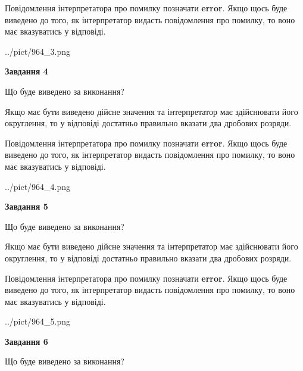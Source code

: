 \documentclass[12pt, ukrainian]{article}
\begin{document}
{\begin {Large}
Повідомлення інтерпретатора про помилку позначати \textbf{error}.
Якщо щось буде виведено до того, як інтерпретатор видасть повідомлення про помилку, 
то воно має вказуватись у відповіді. \par

\begin{center}
	{../pict/964_3.png}
\end{center}
\newpage

{\begin {center}\textbf{Завдання 4}\end {center}}\par
Що буде виведено за виконання? \par

Якщо має бути виведено дійсне значення та інтерпретатор має здійснювати його округлення, 
то у відповіді достатньо правильно вказати два дробових розряди.

Повідомлення інтерпретатора про помилку позначати \textbf{error}.
Якщо щось буде виведено до того, як інтерпретатор видасть повідомлення про помилку, 
то воно має вказуватись у відповіді. \par

\begin{center}
	{../pict/964_4.png}
\end{center}
\newpage

{\begin {center}\textbf{Завдання 5}\end {center}}\par
Що буде виведено за виконання? \par

Якщо має бути виведено дійсне значення та інтерпретатор має здійснювати його округлення, 
то у відповіді достатньо правильно вказати два дробових розряди.

Повідомлення інтерпретатора про помилку позначати \textbf{error}.
Якщо щось буде виведено до того, як інтерпретатор видасть повідомлення про помилку, 
то воно має вказуватись у відповіді. \par

\begin{center}
	{../pict/964_5.png}
\end{center}
\newpage

{\begin {center}\textbf{Завдання 6}\end {center}}\par
Що буде виведено за виконання? \par


\end{Large}}
\end{document}
